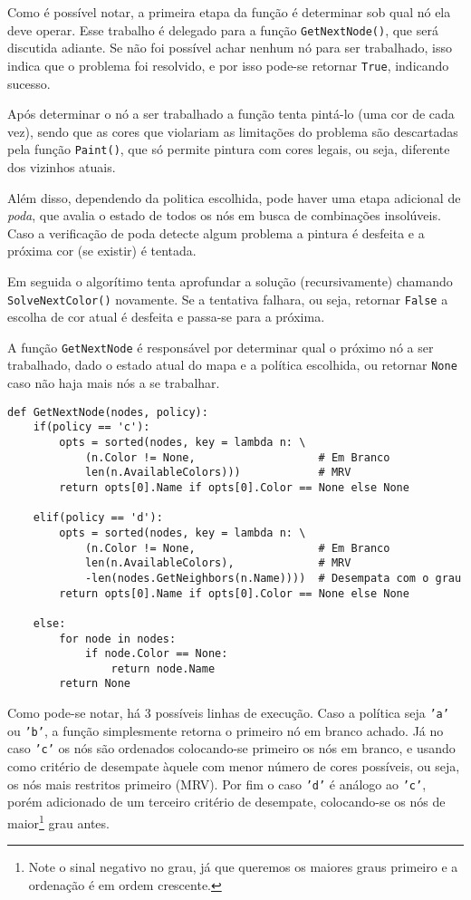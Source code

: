 \documentclass[11pt,towside]{article}
\begin{document}
Como é possível notar, a primeira etapa da função é determinar sob qual nó ela deve operar. Esse trabalho é delegado para a função \texttt{GetNextNode()}, que será discutida adiante. Se não foi possível achar nenhum nó para ser trabalhado, isso indica que o problema foi resolvido, e por isso pode-se retornar \texttt{True}, indicando sucesso.

Após determinar o nó a ser trabalhado a função tenta pintá-lo (uma cor de cada vez), sendo que as cores que violariam as limitações do problema são descartadas pela função \texttt{Paint()}, que só permite pintura com cores legais, ou seja, diferente dos vizinhos atuais.

Além disso, dependendo da politica escolhida, pode haver uma etapa adicional de \emph{poda}, que avalia o estado de todos os nós em busca de combinações insolúveis. Caso a verificação de poda detecte algum problema a pintura é desfeita e a próxima cor (se existir) é tentada.

Em seguida o algorítimo tenta aprofundar a solução (recursivamente) chamando \texttt{SolveNextColor()} novamente. Se a tentativa falhara, ou seja, retornar \texttt{False} a escolha de cor atual é desfeita e passa-se para a próxima.

A função \texttt{GetNextNode} é responsável por determinar qual o próximo nó a ser trabalhado, dado o estado atual do mapa e a política escolhida, ou retornar \texttt{None} caso não haja mais nós a se trabalhar.

\begin{lstlisting}
def GetNextNode(nodes, policy):
    if(policy == 'c'):
        opts = sorted(nodes, key = lambda n: \
            (n.Color != None,                   # Em Branco
            len(n.AvailableColors)))            # MRV
        return opts[0].Name if opts[0].Color == None else None

    elif(policy == 'd'):
        opts = sorted(nodes, key = lambda n: \
            (n.Color != None,                   # Em Branco
            len(n.AvailableColors),             # MRV
            -len(nodes.GetNeighbors(n.Name))))  # Desempata com o grau
        return opts[0].Name if opts[0].Color == None else None

    else:
        for node in nodes:
            if node.Color == None:
                return node.Name
        return None
\end{lstlisting}

Como pode-se notar, há 3 possíveis linhas de execução. Caso a política seja \texttt{'a'} ou \texttt{'b'}, a função simplesmente retorna o primeiro nó em branco achado. Já no caso \texttt{'c'} os nós são ordenados colocando-se primeiro os nós em branco, e usando como critério de desempate àquele com menor número de cores possíveis, ou seja, os nós mais restritos primeiro (MRV). Por fim o caso \texttt{'d'} é análogo ao \texttt{'c'}, porém adicionado de um terceiro critério de desempate, colocando-se os nós de maior\footnote{Note o sinal negativo no grau, já que queremos os maiores graus primeiro e a ordenação é em ordem crescente.} grau antes.
\end{document}
